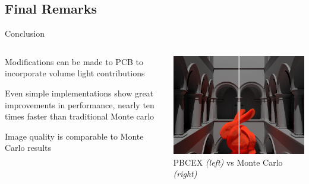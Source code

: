 \documentclass[10pt,compress,professionalfont]{beamer}
\begin{document}
\subsection{Final Remarks}
\begin{frame}{Conclusion}

    \begin{columns}
        \begin{column}{0.5\textwidth}

            Modifications can be made to PCB to incorporate volume light contributions\\
            \vspace{8mm}

            Even simple implementations show great improvements in performance, nearly ten times faster than traditional Monte carlo\\
            \vspace{8mm}

            Image quality is comparable to Monte Carlo results

        \end{column}
        \begin{column}{0.5\textwidth}
            \includegraphics[width=\textwidth]{../img/compare}\\
            {\centering\scriptsize PBCEX \textit{(left)} vs Monte Carlo \textit{(right)} \\}
        \end{column}
    \end{columns}

\end{frame}
\end{document}
